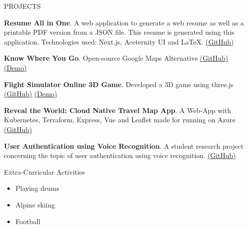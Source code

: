 \documentclass{resume}
\begin{document}
    \begin{rSection}{PROJECTS}
    \vspace{-1.25em}
    
        \item \textbf{Resume All in One}. A web application to generate a web resume as well as a printable PDF version from a JSON file. This resume is generated using this application. Technologies used: Next.js, Aceternity UI and LaTeX. \href{https://github.com/johannesbrandenburger/resume-all-in-one}{(GitHub)} 
        
        \item \textbf{Know Where You Go}. Open-source Google Maps Alternative \href{https://github.com/DHBW-FN-TIT20/know-where-you-go}{(GitHub)} \href{https://know-where-you-go.de}{(Demo)}
        
        \item \textbf{Flight Simulator Online 3D Game}. Developed a 3D game using three.js \href{https://github.com/johannesbrandenburger/flight-simulator-pwa}{(GitHub)} \href{https://flight-simulator.brandenburger.dev}{(Demo)}
        
        \item \textbf{Reveal the World: Cloud Native Travel Map App}. A Web-App with Kubernetes, Terraform, Express, Vue and Leaflet made for running on Azure \href{https://github.com/msi-se/reveal-the-world}{(GitHub)} 
        
        \item \textbf{User Authentication using Voice Recognition}. A student research project concerning the topic of user authentication using voice recognition. \href{https://github.com/DHBW-FN-TIT20/user-authentication-using-voice-recognition}{(GitHub)} 
        
    \end{rSection}
    

    \begin{rSection}{Extra-Curricular Activities}
    \begin{itemize}
    \item Playing drums
\item Alpine skiing
\item Football
    \end{itemize}
    \end{rSection}

    
\end{document}
